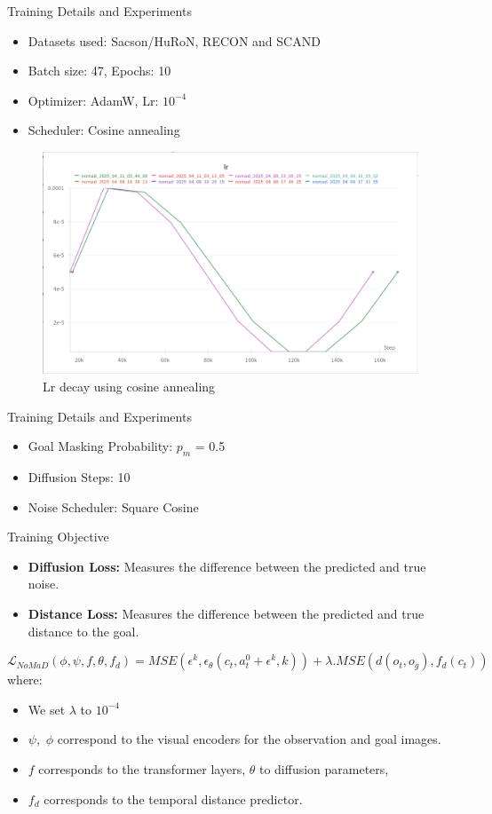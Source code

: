 \documentclass{beamer}
\begin{document}
\begin{frame}{Training Details and Experiments}
\begin{itemize}
    \item Datasets used: Sacson/HuRoN, RECON and SCAND
    \item Batch size: 47, Epochs: 10
    \item Optimizer: AdamW, Lr: $10^{-4}$ 
    \item Scheduler: Cosine annealing
\end{itemize}
\begin{figure}
    \centering
    \includegraphics[width=0.8\linewidth]{lrdecay.png}
    \caption{Lr decay using cosine annealing}
    \label{fig:lrdecay}
\end{figure}
\end{frame}
\begin{frame}{Training Details and Experiments}
    \begin{itemize}
        \item Goal Masking Probability: $p_m$ = 0.5
        \item Diffusion Steps: 10
        \item Noise Scheduler: Square Cosine
    \end{itemize}
    \pause
    \begin{block}{Training Objective}
        \begin{itemize}
            \item \textbf{Diffusion Loss:} Measures the difference between the predicted and true noise.
            \item \textbf{Distance Loss:} Measures the difference between the predicted and true distance to the goal.
        \end{itemize}
    \end{block}
    \[ \mathcal{L}_{NoMaD}(\phi,\psi,f,\theta,f_d) = MSE(\epsilon^{k}, \epsilon_{\theta}(c_t, a^{0}_t + \epsilon^{k},k)) + \lambda .MSE(d(o_t, o_g), f_{d}(c_t))\]
    where:\\
    \begin{itemize}
        \item We set $\lambda$ to $10^{-4}$
        \item $\psi$,\ $\phi$ correspond to the visual encoders for the observation and goal images.
        \item $f$ corresponds to the transformer layers, $\theta$ to diffusion parameters,
        \item $f_d$ corresponds to the temporal distance predictor.
    \end{itemize}
\end{frame}
\end{document}
